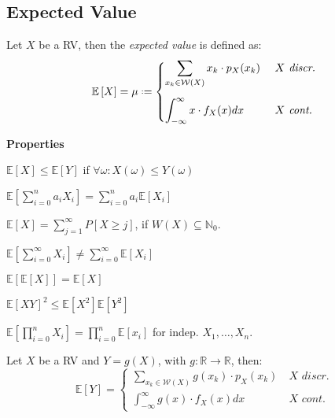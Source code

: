 \documentclass[8pt,a4paper]{extarticle}     %
\newcommand{\R}{\mathbb{R}}
\newcommand{\N}{\mathbb{N}}
\newcommand{\eqdef}{\mathrel{\vcenter{\baselineskip0.5ex\lineskiplimit0pt\hbox{\scriptsize.}\hbox{\scriptsize.}}}=}
\begin{document}
\begin{multicols}{4}
\subsection{Expected Value}
\begin{boxdefinition} 
	Let $X$ be a RV, then the \textit{expected value} is defined as: 
	\[
		\mathbb{E}\left[X\right] = \mu \eqdef 
		\begin{cases}
			\displaystyle \sum_{x_k\in\mathcal{W}(X)} x_k \cdot p_X(x_k) & \ \textit{$X$ discr.} \\[2em]
			\displaystyle \int_{-\infty}^{\infty} x\cdot f_X(x)dx & \ \textit{$X$ cont.}
		\end{cases}
	\]
\end{boxdefinition}
\begin{listb}
	\item [] \textbf{Properties}
	\item $\mathbb{E}\left[X\right] \leq \mathbb{E}\left[Y\right]$ if $\forall \omega : X(\omega) \leq Y(\omega)$
	\item $\mathbb{E}\left[\sum_{i=0}^{n}a_iX_i\right] = \sum_{i=0}^{n}a_i\mathbb{E}\left[X_i\right]$
	\item $\mathbb{E}\left[X\right] = \sum_{j=1}^{\infty} P\left[X\geq j\right]$, if $W(X)\subseteq \N_0$. 
	\item $\mathbb{E}\left[\sum_{i=0}^{\infty} X_i\right] \neq \sum_{i=0}^{\infty} \mathbb{E}\left[X_i\right]$
	\item $\mathbb{E}\left[\mathbb{E}\left[X\right]\right] = \mathbb{E}\left[X\right]$
	\item $\mathbb{E}\left[XY\right]^2 \leq \mathbb{E}\left[X^2\right]\mathbb{E}\left[Y^2\right]$
	\item $\displaystyle\mathbb{E}\left[\prod_{i=0}^{n}X_i\right] = \prod_{i=0}^{n}\mathbb{E}\left[x_i\right]$ for indep. $X_1,\dots,X_n$.
\end{listb}

\begin{boxtheorem} 
	Let $X$ be a RV and $Y=g(X)$, with $g:\R\rightarrow\R$, then:
	\[
		\mathbb{E}\left[Y\right] = 
		\begin{cases}
			\displaystyle \sum_{x_k\in\mathcal{W}(X)} g(x_k)\cdot p_X(x_k) & \ \textit{$X$ discr.} \\[2em]
			\displaystyle \int_{-\infty}^{\infty} g(x)\cdot f_X(x)dx & \ \textit{$X$ cont.}
		\end{cases}
	\]
\end{boxtheorem}


\end{multicols}
\end{document}
